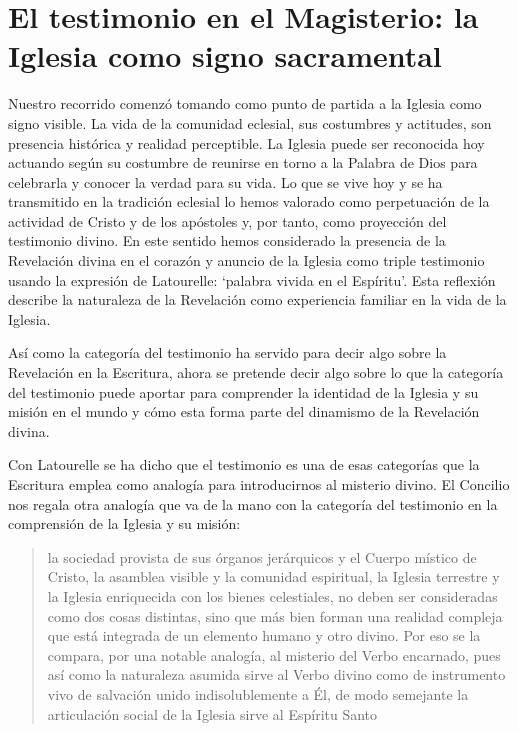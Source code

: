 \filbreak
\section{El testimonio en el Magisterio: la Iglesia como signo sacramental}

Nuestro recorrido comenzó tomando como punto de partida a la Iglesia como signo visible. La vida de la comunidad eclesial, sus costumbres y actitudes, son presencia histórica y realidad perceptible. La Iglesia puede ser reconocida hoy actuando según su costumbre de reunirse en torno a la Palabra de Dios para celebrarla y conocer la verdad para su vida. Lo que se vive hoy y se ha transmitido en la tradición eclesial lo hemos valorado como perpetuación de la actividad de Cristo y de los apóstoles y, por tanto, como proyección del testimonio divino. En este sentido hemos considerado la presencia de la Revelación divina en el corazón y anuncio de la Iglesia como triple testimonio usando la expresión de Latourelle: \enquote*{palabra vivida en el Espíritu}. Esta reflexión describe la naturaleza de la Revelación como experiencia familiar en la vida de la Iglesia.

Así como la categoría del testimonio ha servido para decir algo sobre la Revelación en la Escritura, ahora se pretende decir algo sobre lo que la categoría del testimonio puede aportar para comprender la identidad de la Iglesia y su misión en el mundo y cómo esta forma parte del dinamismo de la Revelación divina.

Con Latourelle se ha dicho que el testimonio es una de esas categorías que la Escritura emplea como analogía para introducirnos al misterio divino. El Concilio nos regala otra analogía que va de la mano con la categoría del testimonio en la comprensión de la Iglesia y su misión: \blockquote[][\,(LG 8)]{la sociedad provista de sus órganos jerárquicos y el Cuerpo místico de Cristo, la asamblea visible y la comunidad espiritual, la Iglesia terrestre y la Iglesia enriquecida con los bienes celestiales, no deben ser consideradas como dos cosas distintas, sino que más bien forman una realidad compleja que está integrada de un elemento humano y otro divino. Por eso se la compara, por una notable analogía, al misterio del Verbo encarnado, pues así como la naturaleza asumida sirve al Verbo divino como de instrumento vivo de salvación unido indisolublemente a Él, de modo semejante la articulación social de la Iglesia sirve al Espíritu Santo}.

